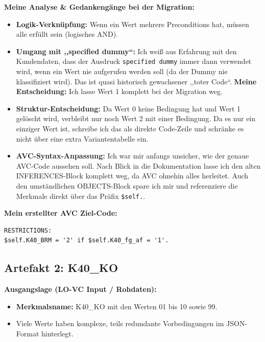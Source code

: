 \documentclass[12pt, a4paper, oneside]{book}
\begin{document}
\textbf{Meine Analyse \& Gedankengänge bei der Migration:}
\begin{itemize}
    \item \textbf{Logik-Verknüpfung:} Wenn ein Wert mehrere Preconditions hat, müssen alle erfüllt sein (logisches AND).
    \item \textbf{Umgang mit ,,specified dummy``:} Ich weiß aus Erfahrung mit den Kundendaten, dass der Ausdruck \texttt{specified dummy} immer dann verwendet wird, wenn ein Wert nie aufgerufen werden soll (da der Dummy nie klassifiziert wird). Das ist quasi historisch gewachsener ,,toter Code``. \textbf{Meine Entscheidung:} Ich lasse Wert 1 komplett bei der Migration weg.
    \item \textbf{Struktur-Entscheidung:} Da Wert 0 keine Bedingung hat und Wert 1 gelöscht wird, verbleibt nur noch Wert 2 mit einer Bedingung. Da es nur ein einziger Wert ist, schreibe ich das als direkte Code-Zeile und schränke es nicht über eine extra Variantentabelle ein.
    \item \textbf{AVC-Syntax-Anpassung:} Ich war mir anfangs unsicher, wie der genaue AVC-Code aussehen soll. Nach Blick in die Dokumentation lasse ich den alten INFERENCES-Block komplett weg, da AVC ohnehin alles herleitet. Auch den umständlichen OBJECTS-Block spare ich mir und referenziere die Merkmale direkt über das Präfix \texttt{\$self.}.
\end{itemize}

\textbf{Mein erstellter AVC Ziel-Code:}
\begin{verbatim}
RESTRICTIONS:
$self.K40_BRM = '2' if $self.K40_fg_af = '1'.
\end{verbatim}

\vspace{1em}

\subsection*{Artefakt 2: K40\_KO}

\textbf{Ausgangslage (LO-VC Input / Rohdaten):}
\begin{itemize}
    \item \textbf{Merkmalsname:} K40\_KO mit den Werten 01 bis 10 sowie 99.
    \item Viele Werte haben komplexe, teils redundante Vorbedingungen im JSON-Format hinterlegt.
\end{itemize}
\end{document}
